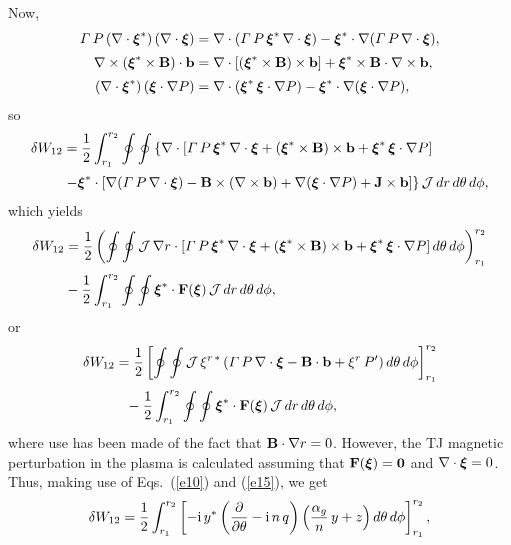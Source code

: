 \documentclass[12pt,prb,aps,notitlepage]{revtex4-1}
\newcommand{\bxi}{\mbox{\boldmath$\xi$}}
\begin{document}
Now,
\begin{align}
{\mit\Gamma}\,P\,(\nabla\cdot\bxi^\ast)\,(\nabla\cdot\bxi)&=\nabla\cdot({\mit\Gamma}\,P\,\bxi^\ast\,\nabla\cdot\bxi)-\bxi^\ast\cdot\nabla(
{\mit\Gamma}\,P\,\nabla\cdot\bxi),\\[0.5ex]
 \nabla\times (\bxi^\ast\times {\bf B})\cdot {\bf b}&= \nabla\cdot[(\bxi^\ast\times {\bf B})\times {\bf b}] + \bxi^\ast\times {\bf B}\cdot\nabla\times {\bf b},\\[0.5ex]
 (\nabla\cdot\bxi^\ast)\,(\bxi\cdot\nabla P)&=\nabla\cdot(\bxi^\ast\,\bxi\cdot\nabla P) -\bxi^\ast\cdot\nabla(\bxi\cdot\nabla P),
\end{align}
so
\begin{align}
\delta W_{12} &= \frac{1}{2}\int_{r_1}^{r_2}\oint\oint\left\{\nabla\cdot[{\mit\Gamma}\,P\,\bxi^\ast\,\nabla\cdot\bxi+ (\bxi^\ast\times {\bf B})\times {\bf b}+\bxi^\ast\,\bxi\cdot\nabla P]\right.\nonumber\\[0.5ex]&\left.-\bxi^\ast\cdot[ \nabla({\mit\Gamma}\,P\,\nabla\cdot\bxi) - {\bf B}\times(\nabla\times {\bf b})+\nabla(\bxi\cdot\nabla P)+{\bf J}\times  {\bf b}]\right\}{\cal J}\,dr\,d\theta\,d\phi,
\end{align}
which yields
\begin{align}
\delta W_{12} &= \frac{1}{2}\left(\oint\oint{\cal J}\,\nabla r\cdot[{\mit\Gamma}\,P\,\bxi^\ast\,\nabla\cdot\bxi+ (\bxi^\ast\times {\bf B})\times {\bf b}+\bxi^\ast\,\bxi\cdot\nabla P]\,d\theta\,d\phi\right)_{r_1}^{r_2}\nonumber\\[0.5ex]
&-\frac{1}{2}\int_{r_1}^{r_2}\oint\oint \bxi^\ast\cdot{\bf F}(\bxi)\,{\cal J}\,dr\,d\theta\,d\phi,
\end{align}
or
\begin{align}
\delta W_{12} &= \frac{1}{2}\left[\oint\oint{\cal J}\,\xi^{r\,\ast}\,({\mit\Gamma}\,P\,\nabla\cdot\bxi -{\bf B}\cdot{\bf b} + \xi^r\,P')\,d\theta\,d\phi\right]_{r_1}^{r_2}\nonumber\\[0.5ex]&\phantom{=}-\frac{1}{2}\int_{r_1}^{r_2}\oint\oint\bxi^\ast\cdot{\bf F}(\bxi)\,{\cal J}\,dr\,d\theta\,d\phi,
\end{align}
where use has been made of the fact that ${\bf B}\cdot\nabla r = 0$.  However, the TJ magnetic perturbation in the plasma is calculated assuming that ${\bf F}(\bxi)={\bf 0}$ and
$\nabla\cdot\bxi=0$.   Thus, making use of Eqs.~(\ref{e10}) and (\ref{e15}), we get
\begin{equation}
\delta W_{12} = \frac{1}{2}\int_{r_1}^{r_2}\left[-{\rm i}\,y^\ast\left(\frac{\partial}{\partial\theta}-{\rm i}\,n\,q\right)\left(\frac{\alpha_g}{n}\,y+z\right)d\theta\,d\phi\right]_{r_1}^{r_2},
\end{equation}
\end{document}
